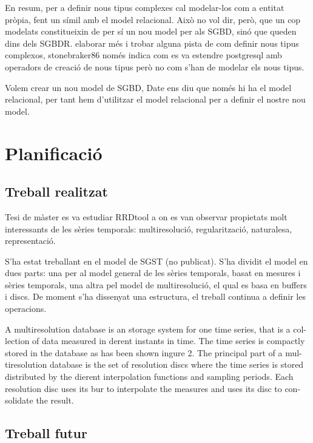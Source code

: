En resum, per a definir nous tipus complexes cal modelar-los com a entitat pròpia, fent un símil amb el model relacional. Això no vol dir, però, que un cop modelats constitueixin de per sí un nou model per als SGBD, sinó que queden dins dels SGBDR.  elaborar més i trobar alguna pista de com definir nous tipus complexos, stonebraker86 només indica com es va estendre postgresql amb operadors de creació de nous tipus però no com s'han de modelar els nous tipus.

Volem crear un nou model de SGBD, Date ens diu que només hi ha el model relacional, per tant hem d'utilitzar el model relacional per a definir el nostre nou model.






\chapter{Planificació}

\section{Treball realitzat}



Tesi de màster es va estudiar RRDtool a on es van observar propietats molt interessants de les sèries temporals: multiresolució, regularització, naturalesa, representació.


S'ha estat treballant en el model de SGST (no publicat). S'ha dividit el model en dues parts: una per al model general de les sèries temporals, basat en mesures i sèries temporals, una altra pel model de multiresolució, el qual es basa en buffers i discs. De moment s'ha dissenyat una estructura, el treball continua a definir les operacions. 


A multiresolution database is an storage system for one time series, that is a col-lection of data measured in derent instants in time. The time series is compactly
stored in the database as has been shown ingure 2. The principal part of a mul-
tiresolution database is the set of resolution discs where the time series is stored
distributed by the dierent interpolation functions and sampling periods.      Each
resolution disc uses its bur to interpolate the measures and uses its disc to con-
solidate the result.


\section{Treball futur}








